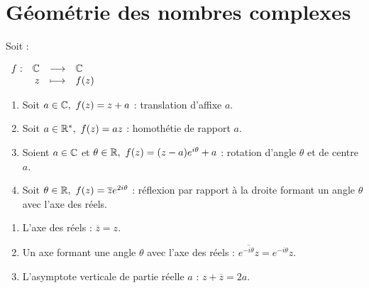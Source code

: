 \section{Géométrie des nombres complexes}
\begin{proposition}
	Soit :
	\begin{center}
		$
		\begin{array}{rrcl} f : & \mathbb{C} & \longrightarrow & \mathbb{C} \\ & z & \longmapsto & f(z) \end{array}
		$
	\end{center}
	\begin{enumerate}
		\item Soit $a \in \mathbb{C},\ f(z) = z + a$ : translation d'affixe $a$.
		\item Soit $a \in \mathbb{R}^*,\ f(z) = az$ : homothétie de rapport $a$.
		\item Soient $a \in \mathbb{C}$ et $\theta \in \mathbb{R},\ f(z) = (z-a)e^{i\theta} + a$ : rotation d'angle $\theta$ et de centre $a$.
		\item Soit $\theta \in \mathbb{R},\ f(z) = \overline{z} e^{2i\theta}$ : réflexion par rapport à la droite formant un angle $\theta$ avec l'axe des réels.
	\end{enumerate}
\end{proposition}

\begin{proposition}
	\begin{enumerate}
		\item L'axe des réels : $\overline{z} = z$.
		\item Un axe formant une angle $\theta$ avec l'axe des réels : $\overline{e^{-i \theta}z} = e^{-i \theta} z$.
		\item L'asymptote verticale de partie réelle $a$ : $z + \overline{z} = 2a$.
	\end{enumerate}
\end{proposition}
